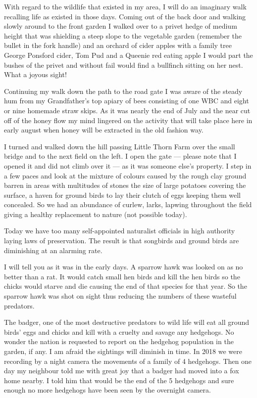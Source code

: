 With regard to the wildlife that existed in my area, I will do an imaginary walk
recalling life as existed in those days. Coming out of the back door and
walking slowly around to the front garden I walked over to a privet hedge of
medium height that was shielding a steep slope to the vegetable garden
(remember the bullet in the fork handle) and an orchard of cider apples with a
family tree George Ponsford cider, Tom Pud and a Queenie red eating apple I
would part the bushes of the privet and without fail would find a bullfinch
sitting on her nest. What a joyous sight!

Continuing my walk down the path to the road gate I was aware of the steady hum
from my Grandfather's top apiary of bees consisting of one WBC and eight or
nine homemade straw skips. As it was nearly the end of July and the near cut
off of the honey flow my mind lingered on the activity that will take place
here in early august when honey will be extracted in the old fashion way.

I turned and walked down the hill passing Little Thorn Farm over the small
bridge and to the next field on the left. I open the gate --- please note that I
opened it and did not climb over it --- as it was someone else's property. I
step in a few paces and look at the mixture of colours caused by the rough clay
ground barren in areas with multitudes of stones the size of large potatoes
covering the surface, a haven for ground birds to lay their clutch of eggs
keeping them well concealed. So we had an abundance of curlew, larks, lapwing
throughout the field giving a healthy replacement to nature (not possible
today).

Today we have too many self-appointed naturalist officials in high authority
laying laws of preservation. The result is that songbirds and ground birds are
diminishing at an alarming rate.

I will tell you as it was in the early days. A sparrow hawk was looked on as no
better than a rat. It would catch small hen birds and kill the hen birds so
the chicks would starve and die causing the end of that species for that year.
So the sparrow hawk was shot on sight thus reducing the numbers of these
wasteful predators.



The badger, one of the most destructive predators to wild life will eat all
ground birds' eggs and chicks and kill with a cruelty and savage any hedgehogs.
No wonder the nation is requested to report on the hedgehog population in the
garden, if any. I am afraid the sightings will diminish in time. In 2018 we
were recording by a night camera the movements of a family of 4 hedgehogs. Then
one day my neighbour told me with great joy that a badger had moved into a fox
home nearby. I told him that would be the end of the 5 hedgehogs and sure
enough no more hedgehogs have been seen by the overnight camera.

